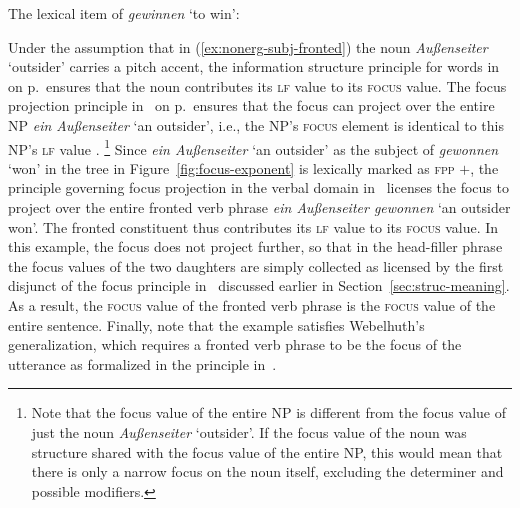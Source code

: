 \documentclass[output=paper,biblatex,babelshorthands,newtxmath,draftmode,colorlinks,citecolor=brown]{langscibook}
\begin{document}
\ea
\label{fig:lex-entry}
The lexical item of \textit{gewinnen} `to win':\\
\z

\largerpage
Under the assumption that in (\ref{ex:nonerg-subj-fronted})
the noun \textit{Außenseiter} `outsider' carries a pitch accent, the
information structure principle for words in~ on p.\,\pageref{fig:words}
ensures that the noun contributes its \textsc{lf} value to
its \textsc{focus}  value. The focus projection principle in~ on p.\,\pageref{fig:focus-projection} ensures that the focus can project
over the entire NP \textit{ein Außenseiter} `an outsider', i.e., the NP's \textsc{focus}
element is identical to this NP's \textsc{lf} value . \footnote{Note that the focus value of
  the entire NP is different from the focus value of just the noun \textit{Außenseiter} `outsider'. If the focus value of the noun was structure shared with the focus value of the entire NP, this would mean that there is only a narrow focus on the noun itself, excluding the determiner and possible modifiers.} Since \textit{ein
  Außenseiter} `an outsider' as the subject of \textit{gewonnen} `won' in the tree in
Figure~\ref{fig:focus-exponent} is lexically marked as \textsc{fpp}
$+$, the principle governing focus projection in the verbal
domain in~ licenses the focus to
project over the entire fronted verb phrase \textit{ein
  Außenseiter gewonnen} `an outsider won'. The fronted constituent thus contributes its
\textsc{lf} value to its \textsc{focus} value. In this example, the
focus does not project further, so that in the head-filler phrase the
focus values of the two daughters are simply collected as licensed by
the first disjunct of the focus principle in~ discussed earlier in
Section~\ref{sec:struc-meaning}. As a result, the \textsc{focus} value
of the fronted verb phrase is the \textsc{focus} value of the
entire sentence. Finally, note that the example satisfies Webelhuth's
generalization, which requires a fronted verb phrase to be the
focus of the utterance as formalized in the principle in~.
\end{document}
